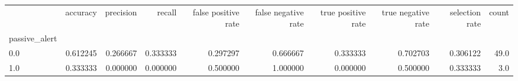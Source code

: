\begin{tabular}{lrrrrrrrrr}
\toprule
{} &  accuracy &  precision &    recall &  false positive rate &  false negative rate &  true positive rate &  true negative rate &  selection rate &  count \\
passive\_alert &           &            &           &                      &                      &                     &                     &                 &        \\
\midrule
0.0           &  0.612245 &   0.266667 &  0.333333 &             0.297297 &             0.666667 &            0.333333 &            0.702703 &        0.306122 &   49.0 \\
1.0           &  0.333333 &   0.000000 &  0.000000 &             0.500000 &             1.000000 &            0.000000 &            0.500000 &        0.333333 &    3.0 \\
\bottomrule
\end{tabular}

